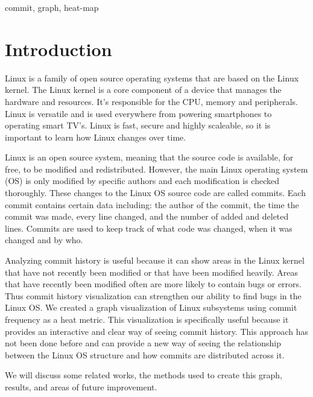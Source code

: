 \documentclass[conference]{IEEEtran}
\begin{document}
\begin{IEEEkeywords}
commit, graph, heat-map
\end{IEEEkeywords}

\section{Introduction}
Linux is a family of open source operating systems that are based on the Linux kernel. The Linux kernel is a core component of a device that manages the hardware and resources. It's responsible for the CPU, memory and peripherals. Linux is versatile and is used everywhere from powering smartphones to operating smart TV's. Linux is fast, secure and highly scaleable, so it is important to learn how Linux changes over time.%

Linux is an open source system, meaning that the source code is available, for free, to be modified and redistributed. However, the main Linux operating system (OS) is only modified by specific authors and each modification is checked thoroughly. These changes to the Linux OS source code are called commits. Each commit contains certain data including: the author of the commit, the time the commit was made, every line changed, and the number of added and deleted lines. Commits are used to keep track of what code was changed, when it was changed and by who. %



Analyzing commit history is useful because it can show areas in the Linux kernel that have not recently been modified or that have been modified heavily. Areas that have recently been modified often are more likely to contain bugs or errors. Thus commit history visualization can strengthen our ability to find bugs in the Linux OS. We created a graph visualization of Linux subsystems using commit frequency as a heat metric. This visualization is specifically useful because it provides an interactive and clear way of seeing commit history. This approach has not been done before and can provide a new way of seeing the relationship between the Linux OS structure and how commits are distributed across it. %

We will discuss some related works, the methods used to create this graph, results, and areas of future improvement.
\end{document}
